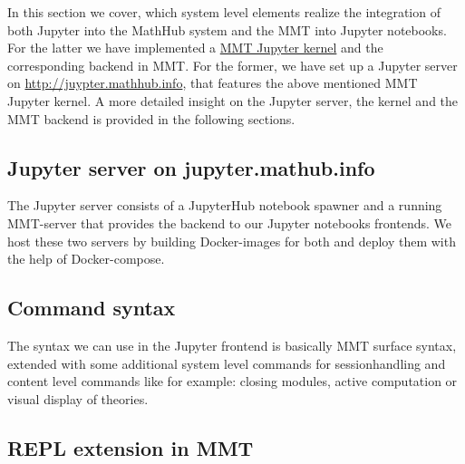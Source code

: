 

In this section we cover, which system level elements realize the integration of both Jupyter into the MathHub system 
and the MMT into Jupyter notebooks. For the latter we have implemented a \hyperlink{https://github.com/UniFormal/mmt_jupyter_kernel}{MMT Jupyter kernel} and 
the corresponding backend in MMT. For the former, we have set up a Jupyter server on \url{http://juypter.mathhub.info},
that features the above mentioned MMT Jupyter kernel. A more detailed insight on the Jupyter server, the kernel and the MMT backend 
is provided in the following sections. 

\subsection{Jupyter server on jupyter.mathub.info}\label{sec:jps}
The Jupyter server consists of a JupyterHub notebook spawner and a running MMT-server that provides the backend
to our Jupyter notebooks frontends. We host these two servers by building Docker-images for both and deploy them with
the help of Docker-compose. 

\subsection{Command syntax}
The syntax we can use in the Jupyter frontend is basically MMT surface syntax, extended with some additional system level 
commands for sessionhandling and content level commands like for example: closing modules, active computation or visual display of theories. 

\subsection{REPL extension in MMT}

